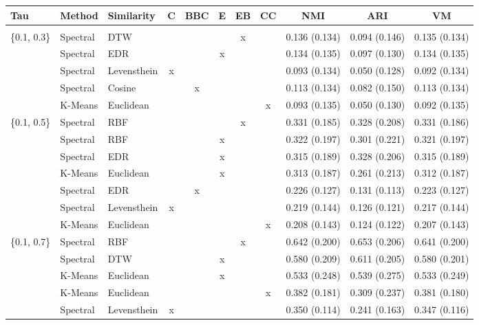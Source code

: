\documentclass[12pt,a4paper,bibliography=totocnumbered,listof=totocnumbered]{scrartcl}
\begin{document}
{\begin{appendix}
\begin{table}[H] \centering 
	\label{} 
	\scriptsize
		\begin{tabularx}{\textwidth}{ lllcccccccc} \\
			\toprule
			Tau & Method & Similarity & C & BBC & E & EB & CC & NMI & ARI & VM \\ 
			\hline \\[-1.8ex] 
		\{0.1, 0.3\} & Spectral & DTW &  &  &  & x &  & 0.136 (0.134) & 0.094 (0.146) & 0.135 (0.134) \\ 
		& Spectral & EDR &  &  & x &  &  & 0.134 (0.135) & 0.097 (0.130) & 0.134 (0.135) \\ 
		& Spectral & Levensthein & x &  &  &  &  & 0.093 (0.134) & 0.050 (0.128) & 0.092 (0.134) \\ 
		& Spectral & Cosine &  & x &  &  &  & 0.113 (0.134) & 0.082 (0.150) & 0.113 (0.134) \\ 
		& K-Means & Euclidean &  &  &  &  & x & 0.093 (0.135) & 0.050 (0.130) & 0.092 (0.135) \\ 
		\{0.1, 0.5\} & Spectral & RBF &  &  &  & x &  & 0.331 (0.185) & 0.328 (0.208) & 0.331 (0.186) \\ 
		& Spectral & RBF &  &  & x &  &  & 0.322 (0.197) & 0.301 (0.221) & 0.321 (0.197) \\ 
		& Spectral & EDR &  &  & x &  &  & 0.315 (0.189) & 0.328 (0.206) & 0.315 (0.189) \\ 
		& K-Means & Euclidean &  &  & x &  &  & 0.313 (0.187) & 0.261 (0.213) & 0.312 (0.187) \\ 
		& Spectral & EDR &  & x &  &  &  & 0.226 (0.127) & 0.131 (0.113) & 0.223 (0.127) \\ 
		& Spectral & Levensthein & x &  &  &  &  & 0.219 (0.144) & 0.126 (0.121) & 0.217 (0.144) \\ 
		& K-Means & Euclidean &  &  &  &  & x & 0.208 (0.143) & 0.124 (0.122) & 0.207 (0.143) \\ 
		\{0.1, 0.7\} & Spectral & RBF &  &  &  & x &  & 0.642 (0.200) & 0.653 (0.206) & 0.641 (0.200) \\ 
		& Spectral & DTW &  &  & x &  &  & 0.580 (0.209) & 0.611 (0.205) & 0.580 (0.201) \\ 
		& K-Means & Euclidean &  &  & x &  &  & 0.533 (0.248) & 0.539 (0.275) & 0.533 (0.249) \\ 
		& K-Means & Euclidean &  &  &  &  & x & 0.382 (0.181) & 0.309 (0.237) & 0.381 (0.180) \\ 
		& Spectral & Levensthein & x &  &  &  &  & 0.350 (0.114) & 0.241 (0.163) & 0.347 (0.116) \\ 

\end{tabularx}
\end{table}
\end{appendix}}
\end{document}
